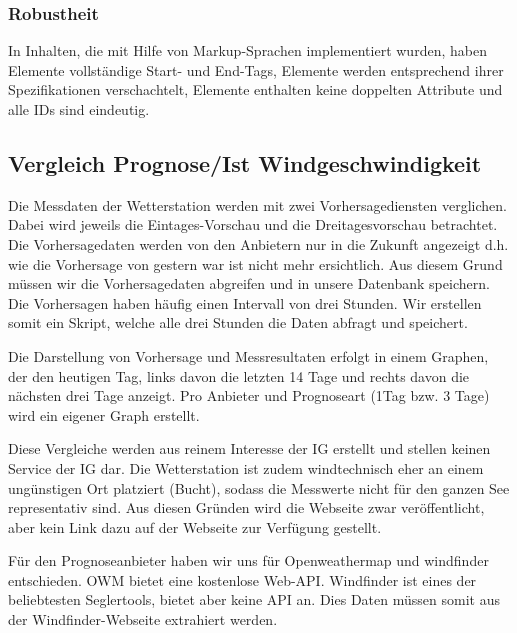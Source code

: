 \subsubsection*{Robustheit}
 In Inhalten, die mit Hilfe von Markup-Sprachen implementiert wurden, haben Elemente vollständige Start- und End-Tags, Elemente werden entsprechend ihrer Spezifikationen verschachtelt, Elemente enthalten keine doppelten Attribute und alle IDs sind eindeutig.






\subsection{Vergleich Prognose/Ist Windgeschwindigkeit}

Die Messdaten der Wetterstation werden mit zwei Vorhersagediensten verglichen. Dabei wird jeweils die Eintages-Vorschau und die Dreitagesvorschau betrachtet.
Die Vorhersagedaten werden von den Anbietern nur in die Zukunft angezeigt d.h. wie die Vorhersage von gestern war ist nicht mehr ersichtlich. Aus diesem Grund müssen wir die Vorhersagedaten abgreifen und in unsere Datenbank speichern. Die Vorhersagen haben häufig einen Intervall von drei Stunden. Wir erstellen somit ein Skript, welche alle drei Stunden die Daten abfragt und speichert.

Die Darstellung von Vorhersage und Messresultaten erfolgt in einem Graphen, der den heutigen Tag, links davon die letzten 14 Tage und rechts davon die nächsten drei Tage anzeigt. Pro Anbieter und Prognoseart (1Tag bzw. 3 Tage) wird ein eigener Graph erstellt.

Diese Vergleiche werden aus reinem Interesse der IG erstellt und stellen keinen Service der IG dar. Die Wetterstation ist zudem windtechnisch eher an einem ungünstigen Ort platziert (Bucht), sodass die Messwerte nicht für den ganzen See representativ sind.
Aus diesen Gründen wird die Webseite zwar veröffentlicht, aber kein Link dazu auf der Webseite zur Verfügung gestellt.

Für den Prognoseanbieter haben wir uns für Openweathermap und windfinder entschieden. OWM bietet eine kostenlose Web-API. Windfinder ist eines der beliebtesten Seglertools, bietet aber keine API an. Dies Daten müssen somit aus der Windfinder-Webseite extrahiert werden.

